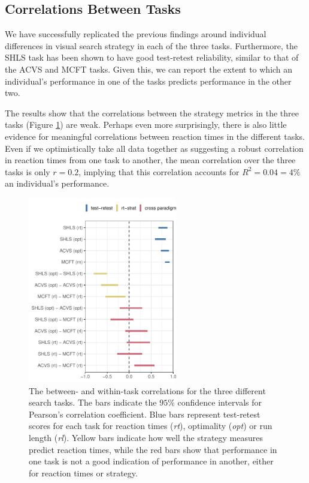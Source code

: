 \documentclass[a4paper, man, natbib, floatsintext]{apa6}
\begin{document}
\subsection{Correlations Between Tasks}

We have successfully replicated the previous findings around individual differences in visual search strategy in each of the three tasks. Furthermore, the SHLS task has been shown to have good test-retest reliability, similar to that of the ACVS  and MCFT tasks. Given this, we can report the extent to which an individual's performance in one of the tasks predicts performance in the other two. 

The results show that the correlations between the strategy metrics in the three tasks (Figure \ref{fig:all_the_cor}) are weak. Perhaps even more surprisingly, there is also little evidence for meaningful correlations between reaction times in the different tasks. Even if we optimistically take all data together as suggesting a robust correlation in reaction times from one task to another, the mean correlation over the three tasks is only $r = 0.2$, implying that this correlation accounts for  $R^2 = 0.04 = 4\%$ an individual's performance. 

\begin{figure}
\centering
\includegraphics[width=6.5cm]{../Scripts/scratch/cor_comparison.pdf}
\caption{The between- and within-task correlations for the three different search tasks. The bars indicate the $95\%$ confidence intervals for Pearson's correlation coefficient. Blue bars represent test-retest scores for each task for reaction times (\textit{rt}), optimality (\textit{opt}) or run length (\textit{rl}). Yellow bars indicate how well the strategy measures predict reaction times, while the red bars show that performance in one task is not a good indication of performance in another, either for reaction times or strategy.}
\label{fig:all_the_cor}
\end{figure}
\end{document}
